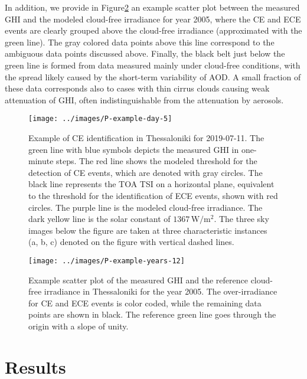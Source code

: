 \documentclass[preprint, 5p,
authoryear]{elsarticle} %
\begin{document}
In addition, we provide in Figure\nobreakspace{}\ref{fig:example-year}
an example scatter plot between the measured GHI and the modeled
cloud-free irradiance for year 2005, where the CE and ECE events are
clearly grouped above the cloud-free irradiance (approximated with the
green line). The gray colored data points above this line correspond to
the ambiguous data points discussed above. Finally, the black belt just
below the green line is formed from data measured mainly under
cloud-free conditions, with the spread likely caused by the short-term
variability of AOD. A small fraction of these data corresponds also to
cases with thin cirrus clouds causing weak attenuation of GHI, often
indistinguishable from the attenuation by aerosols.

\begin{figure}[H]

{\centering \texttt{[image: ../images/P-example-day-5]} 

}

\caption{Example of CE identification in Thessaloniki for 2019-07-11. The green line with blue symbols depicts the measured GHI in one-minute steps. The red line shows the modeled threshold for the detection of CE events, which are denoted with gray circles. The black line represents the TOA TSI on a horizontal plane, equivalent to the threshold for the identification of ECE events, shown with red circles. The purple line is the modeled cloud-free irradiance. The dark yellow line is the solar constant of $1367\,\text{W}/\text{m}^{2}$. The three sky images below the figure are taken at three characteristic instances (a, b, c) denoted on the figure with vertical dashed lines.}\label{fig:example-day}
\end{figure}

\begin{figure}[H]

{\centering \texttt{[image: ../images/P-example-years-12]} 

}

\caption{Example scatter plot of the measured GHI and the reference cloud-free irradiance in Thessaloniki for the year 2005. The over-irradiance for CE and ECE events is color coded, while the remaining data points are shown in black. The reference green line goes through the origin with a slope of unity.}\label{fig:example-year}
\end{figure}

\hypertarget{results}{%
\section{Results}\label{results}}
\end{document}
